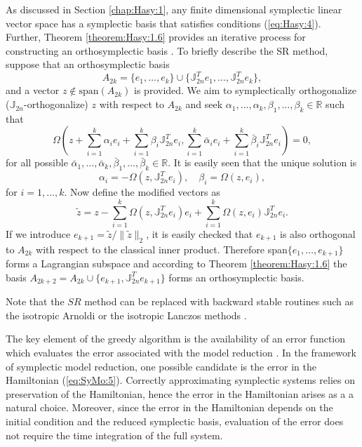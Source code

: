 \documentclass[final]{siamart}
\begin{document}
{{\color{black}}
As discussed in Section \ref{chap:Hasy:1}, any finite dimensional symplectic linear vector space has a symplectic basis that satisfies conditions (\ref{eq:Hasy:4}). Further, Theorem \ref{theorem:Hasy:1.6} provides an iterative process for constructing an orthosymplectic basis \cite{Matsuo:2014wl,Salam2014}. To briefly describe the SR method, suppose that an orthosymplectic basis
\begin{equation} \label{eq:SyMo:14.1}
	A_{2k}=\{ e_1 , \dots , e_k \} \cup \{ \mathbb J_{2n}^T e_1 , \dots , \mathbb J_{2n}^T e_k \},
\end{equation}
and a vector $z\not \in \text{span}(A_{2k})$ is provided. We aim to symplectically orthogonalize ($\mathbb J_{2n}$-orthogonalize) $z$ with respect to $A_{2k}$ and seek $\alpha_1,\dots,\alpha_k,\beta_1,\dots,\beta_k \in \mathbb R$ such that
\begin{equation} \label{eq:SyMo:14.2}
	\Omega\left(z + \sum_{i=1}^k \alpha_i e_i + \sum_{i=1}^k \beta_i \mathbb J_{2n}^Te_i , \sum_{i=1}^k \bar{\alpha}_i e_i + \sum_{i=1}^k \bar{\beta}_i \mathbb J_{2n}^Te_i \right) = 0,
\end{equation}
for all possible $\bar{\alpha}_1,\dots,\bar{\alpha}_k,\bar{\beta}_1,\dots,\bar{\beta}_k \in \mathbb R$. It is easily seen that the unique solution is 
\begin{equation} \label{eq:SyMo:14.3}
	\alpha_i = - \Omega(z,\mathbb J_{2n}^Te_i), \quad \beta_i = \Omega(z,e_i),
\end{equation}
for $i=1,\dots,k$. Now define the modified vectors as
\begin{equation} \label{eq:SyMo:14.4}
	\tilde z = z - \sum_{i=1}^k \Omega(z,\mathbb J_{2n}^Te_i) e_i + \sum_{i=1}^k \Omega(z,e_i) \mathbb J_{2n}^Te_i.
\end{equation}
If we introduce $e_{k+1} = \tilde z / \| \tilde z \|_2$, it is easily checked that $e_{k+1}$ is also orthogonal to $A_{2k}$ with respect to the classical inner product. Therefore span$\{e_1,\dots,e_{k+1}\}$ forms a Lagrangian subspace and according to Theorem \ref{theorem:Hasy:1.6} the basis $A_{2k+2}= A_{2k}\cup \{ e_{k+1} , \mathbb J_{2n}^T e_{k+1} \}$ forms an orthosymplectic basis.

Note that the $SR$ method can be replaced with backward stable routines such as the isotropic Arnoldi or the isotropic Lanczos methods \cite{Mehrmann:2000dv}.
}

The key element of the greedy algorithm is the availability of an error function which evaluates the error associated with the model reduction \cite{Anonymous:2016wl}. In the framework of symplectic model reduction, one possible candidate is the error in the Hamiltonian (\ref{eq:SyMo:5}). Correctly approximating symplectic systems relies on preservation of the Hamiltonian, hence the error in the Hamiltonian {{\color{black}} arises as a} a natural choice. Moreover, since the error in the Hamiltonian depends on the initial condition and the reduced symplectic basis, evaluation of the error does not require the time integration of the full system. 
\end{document}
